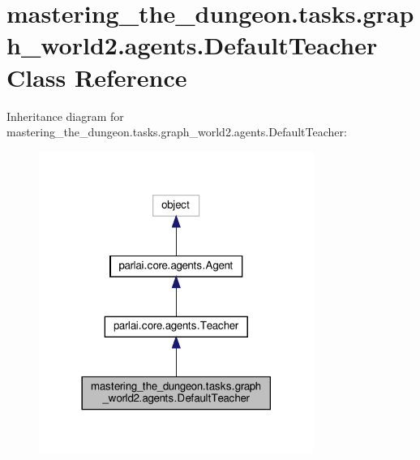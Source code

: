 \hypertarget{classmastering__the__dungeon_1_1tasks_1_1graph__world2_1_1agents_1_1DefaultTeacher}{}\section{mastering\+\_\+the\+\_\+dungeon.\+tasks.\+graph\+\_\+world2.\+agents.\+Default\+Teacher Class Reference}
\label{classmastering__the__dungeon_1_1tasks_1_1graph__world2_1_1agents_1_1DefaultTeacher}


Inheritance diagram for mastering\+\_\+the\+\_\+dungeon.\+tasks.\+graph\+\_\+world2.\+agents.\+Default\+Teacher\+:
\nopagebreak
\begin{figure}[H]
\begin{center}
\leavevmode
\includegraphics[width=254pt]{classmastering__the__dungeon_1_1tasks_1_1graph__world2_1_1agents_1_1DefaultTeacher__inherit__graph}
\end{center}
\end{figure}


